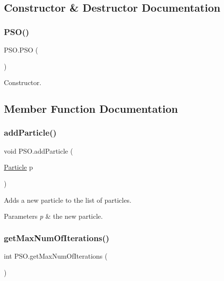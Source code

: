 \subsection{Constructor \& Destructor Documentation}
\mbox{\label{class_p_s_o_a0aeec4970276a5e318b613e8a192064e}} 
\subsubsection{\texorpdfstring{P\+S\+O()}{PSO()}}
{\footnotesize\ttfamily P\+S\+O.\+P\+SO (\begin{DoxyParamCaption}{ }\end{DoxyParamCaption})}

Constructor. 

\subsection{Member Function Documentation}
\mbox{\label{class_p_s_o_ac3676d8b4b6eb1fcb0c05a14a20af85c}} 
\subsubsection{\texorpdfstring{add\+Particle()}{addParticle()}}
{\footnotesize\ttfamily void P\+S\+O.\+add\+Particle (\begin{DoxyParamCaption}\item[{\hyperlink{class_particle}{Particle}}]{p }\end{DoxyParamCaption})}

Adds a new particle to the list of particles. 
\begin{DoxyParams}{Parameters}
{\em p} & the new particle. \\
\hline
\end{DoxyParams}
\mbox{\label{class_p_s_o_a0d3cd48e829ba5ccb754e26f1890e51b}} 
\subsubsection{\texorpdfstring{get\+Max\+Num\+Of\+Iterations()}{getMaxNumOfIterations()}}
{\footnotesize\ttfamily int P\+S\+O.\+get\+Max\+Num\+Of\+Iterations (\begin{DoxyParamCaption}{ }\end{DoxyParamCaption})}


